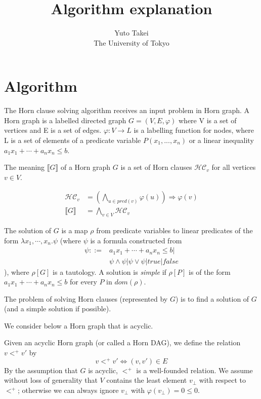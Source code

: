 \documentclass[a4paper,12pt]{article}
\title{Algorithm explanation}
\author{Yuto Takei \\ The University of Tokyo}
\begin{document}
\maketitle

\section{Algorithm}

The Horn clause solving algorithm receives an input problem in Horn
graph. A Horn graph is a labelled directed graph $G=(V,E,\varphi)$
where V is a set of vertices and E is a set of edges. $\varphi: V
\rightarrow L$ is a labelling function for nodes, where L is a set of
elements of a predicate variable $P(x_1, ..., x_n)$ or a linear
inequality $a_1 x_1 + \cdots + a_n x_n \leq b$.

The meaning $\llbracket G \rrbracket $ of a Horn graph $G$ is a set of
Horn clauses $\mathcal{HC}_v$ for all vertices $v \in V$.

\begin{align*}
\mathcal{HC}_v &= \left( \bigwedge_{u \in pred(v)} \varphi(u) \right)
\Longrightarrow \varphi(v) \\ \llbracket G \rrbracket &= \bigwedge_{v
  \in V} \mathcal{HC}_v
\end{align*}

The solution of $G$ is a map $\rho$ from predicate variables to linear
predicates of the form $\lambda x_1, \cdots ,x_n. \psi $ (where $\psi$
is a formula constructed from
\begin{align*}
\psi ::= &a_1 x_1 + \cdots + a_n x_n \leq b \vert \\ &\psi \wedge \psi
\vert \psi \vee \psi \vert true \vert false
\end{align*}
), where $\rho[G]$ is a tautology. A solution is \textit{simple} if
$\rho[P]$ is of the form $a_1 x_1 + \cdots + a_n x_n \leq b$ for every
$P$ in $dom(\rho)$.

The problem of solving Horn clauses (represented by $G$) is to find a
solution of $G$ (and a simple solution if possible).

We consider below a Horn graph that is acyclic.

Given an acyclic Horn graph (or called a Horn DAG), we define the
relation $v <^+ v'$ by
\[ v <^+ v' \Longleftrightarrow (v,v') \in E \]
By the assumption that $G$ is acyclic, $<^+$ is a well-founded
relation.  We assume without loss of generality that $V$ contains the
least element $v_\bot$ with respect to $<^+$; otherwise we can always
ignore $v_\bot$ with $\varphi(v_\bot) = 0 \leq 0$.
\end{document}
